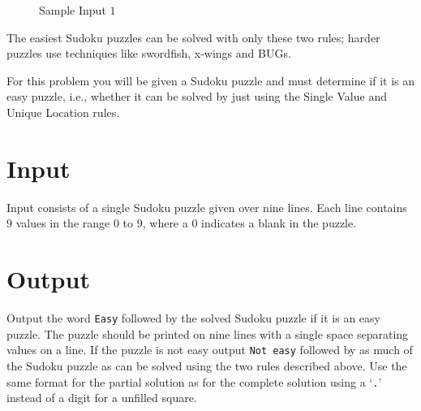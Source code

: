 \begin{figure}[h]
%
%
%
%
\caption{Sample Input $1$}
\label{fig1:example}
\end{figure}
The easiest Sudoku puzzles can be solved with only these two rules; harder puzzles use techniques like swordfish, x-wings and BUGs.

For this problem you will be given a Sudoku puzzle and must determine if it is an easy puzzle, i.e., whether it can be solved by just using the Single Value and Unique Location rules.

\section*{Input}
Input consists of a single Sudoku puzzle given over nine lines.  Each line contains $9$ values in the range $0$ to $9$, where a $0$ indicates a blank in the puzzle.

\section*{Output}
Output the word {\tt Easy} followed by the solved Sudoku puzzle if it is an easy puzzle.  The puzzle should be printed on nine lines with a single space separating values on a line.  If the puzzle is not easy output {\tt Not easy} followed by as much of the Sudoku puzzle as can be solved using the two rules described above.  Use the same format for the partial solution as for the complete solution using a `{\tt .}' instead of a digit for a unfilled square.
